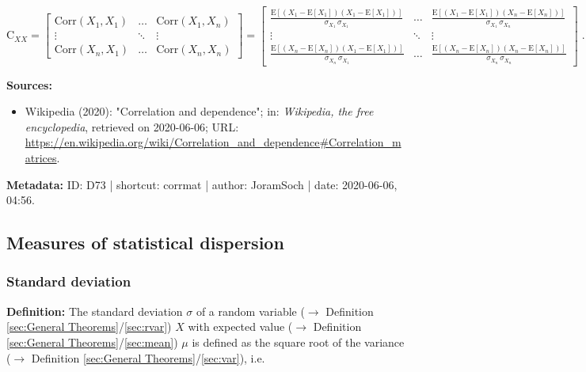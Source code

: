\documentclass[a4paper,12pt,twoside]{book}
\begin{document}
\begin{equation} \label{eq:corrmat-corrmat}
\mathrm{C}_{XX} =
\begin{bmatrix}
\mathrm{Corr}(X_1,X_1) & \ldots & \mathrm{Corr}(X_1,X_n) \\
\vdots & \ddots & \vdots \\
\mathrm{Corr}(X_n,X_1) & \ldots & \mathrm{Corr}(X_n,X_n)
\end{bmatrix} =
\begin{bmatrix}
\frac{\mathrm{E}\left[(X_1-\mathrm{E}[X_1]) (X_1-\mathrm{E}[X_1])\right]}{\sigma_{X_1} \, \sigma_{X_1}} & \ldots & \frac{\mathrm{E}\left[(X_1-\mathrm{E}[X_1]) (X_n-\mathrm{E}[X_n])\right]}{\sigma_{X_1} \, \sigma_{X_n}} \\
\vdots & \ddots & \vdots \\
\frac{\mathrm{E}\left[(X_n-\mathrm{E}[X_n]) (X_1-\mathrm{E}[X_1])\right]}{\sigma_{X_n} \, \sigma_{X_1}} & \ldots & \frac{\mathrm{E}\left[(X_n-\mathrm{E}[X_n]) (X_n-\mathrm{E}[X_n])\right]}{\sigma_{X_n} \, \sigma_{X_n}}
\end{bmatrix} \; .
\end{equation}


\vspace{1em}
\textbf{Sources:}
\begin{itemize}
\item Wikipedia (2020): "Correlation and dependence"; in: \textit{Wikipedia, the free encyclopedia}, retrieved on 2020-06-06; URL: \url{https://en.wikipedia.org/wiki/Correlation_and_dependence#Correlation_matrices}.
\end{itemize}


\vspace{1em}
\textbf{Metadata:} ID: D73 | shortcut: corrmat | author: JoramSoch | date: 2020-06-06, 04:56.
\vspace{1em}



\subsection{Measures of statistical dispersion}

\subsubsection[\textit{Standard deviation}]{Standard deviation} \label{sec:std}
\setcounter{equation}{0}

\textbf{Definition:} The standard deviation $\sigma$ of a random variable ($\rightarrow$ Definition \ref{sec:General Theorems}/\ref{sec:rvar}) $X$ with expected value ($\rightarrow$ Definition \ref{sec:General Theorems}/\ref{sec:mean}) $\mu$ is defined as the square root of the variance ($\rightarrow$ Definition \ref{sec:General Theorems}/\ref{sec:var}), i.e.
\end{document}
